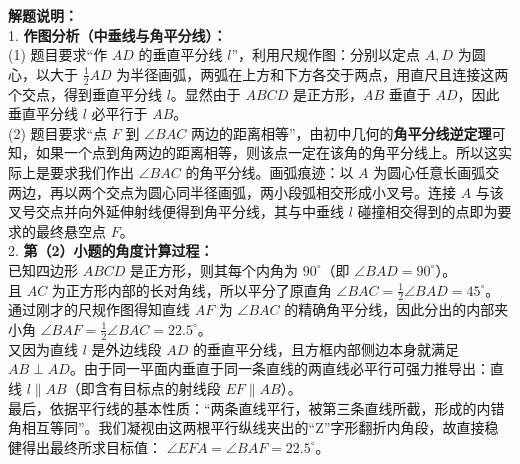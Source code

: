 {\small\color{gray}
\textbf{解题说明：}\\
1. \textbf{作图分析（中垂线与角平分线）：}\\
(1) 题目要求“作 $AD$ 的垂直平分线 $l$”，利用尺规作图：分别以定点 $A, D$ 为圆心，以大于 $\frac{1}{2}AD$ 为半径画弧，两弧在上方和下方各交于两点，用直尺且连接这两个交点，得到垂直平分线 $l$。显然由于 $ABCD$ 是正方形，$AB$ 垂直于 $AD$，因此垂直平分线 $l$ 必平行于 $AB$。\\
(2) 题目要求“点 $F$ 到 $\angle BAC$ 两边的距离相等”，由初中几何的\textbf{角平分线逆定理}可知，如果一个点到角两边的距离相等，则该点一定在该角的角平分线上。所以这实际上是要求我们作出 $\angle BAC$ 的角平分线。画弧痕迹：以 $A$ 为圆心任意长画弧交两边，再以两个交点为圆心同半径画弧，两小段弧相交形成小叉号。连接 $A$ 与该叉号交点并向外延伸射线便得到角平分线，其与中垂线 $l$ 碰撞相交得到的点即为要求的最终悬空点 $F$。\\
2. \textbf{第（2）小题的角度计算过程：}\\
已知四边形 $ABCD$ 是正方形，则其每个内角为 $90^\circ$（即 $\angle BAD = 90^\circ$）。\\
且 $AC$ 为正方形内部的长对角线，所以平分了原直角 $\angle BAC = \frac{1}{2}\angle BAD = 45^\circ$。\\
通过刚才的尺规作图得知直线 $AF$ 为 $\angle BAC$ 的精确角平分线，因此分出的内部夹小角 $\angle BAF = \frac{1}{2}\angle BAC = 22.5^\circ$。\\
又因为直线 $l$ 是外边线段 $AD$ 的垂直平分线，且方框内部侧边本身就满足 $AB \perp AD$。由于同一平面内垂直于同一条直线的两直线必平行可强力推导出：直线 $l \parallel AB$（即含有目标点的射线段 $EF \parallel AB$）。\\
最后，依据平行线的基本性质：“两条直线平行，被第三条直线所截，形成的内错角相互等同”。我们凝视由这两根平行纵线夹出的“Z”字形翻折内角段，故直接稳健得出最终所求目标值： $\angle EFA = \angle BAF = 22.5^\circ$。
}

\vspace{0.6cm}

